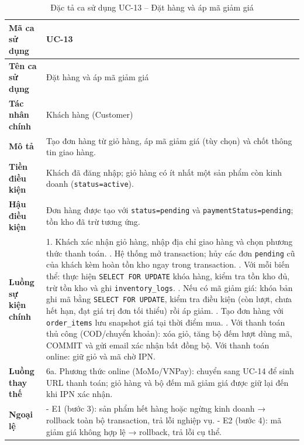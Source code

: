 \begin{longtable}{|p{3cm}|p{10.5cm}|}
  \caption{Đặc tả ca sử dụng UC-13 -- Đặt hàng và áp mã giảm giá}
  \label{tab:uc_spec_13} \\
  \hline
  \textbf{Mã ca sử dụng} & UC-13 \\ \hline
  \textbf{Tên ca sử dụng} & Đặt hàng và áp mã giảm giá \\ \hline
  \textbf{Tác nhân chính} & Khách hàng (Customer) \\ \hline
  \textbf{Mô tả} & Tạo đơn hàng từ giỏ hàng, áp mã giảm giá (tùy chọn) và chốt thông tin giao hàng. \\ \hline
  \textbf{Tiền điều kiện} & Khách đã đăng nhập; giỏ hàng có ít nhất một sản phẩm còn kinh doanh (\texttt{status=active}). \\ \hline
  \textbf{Hậu điều kiện} & Đơn hàng được tạo với \texttt{status=pending} và \texttt{paymentStatus=pending}; tồn kho đã trừ tương ứng. \\ \hline
  \textbf{Luồng sự kiện chính} &
  1. Khách xác nhận giỏ hàng, nhập địa chỉ giao hàng và chọn phương thức thanh toán. \newline
  2. Hệ thống mở transaction; hủy các đơn \texttt{pending} cũ của khách kèm hoàn tồn kho ngay trong transaction. \newline
  3. Với mỗi biến thể: thực hiện \texttt{SELECT FOR UPDATE} khóa hàng, kiểm tra tồn kho đủ, trừ tồn kho và ghi \texttt{inventory\_logs}. \newline
  4. Nếu có mã giảm giá: khóa bản ghi mã bằng \texttt{SELECT FOR UPDATE}, kiểm tra điều kiện (còn lượt, chưa hết hạn, đạt giá trị đơn tối thiểu) rồi áp giảm. \newline
  5. Tạo đơn hàng với \texttt{order\_items} lưu snapshot giá tại thời điểm mua. \newline
  6. Với thanh toán thủ công (COD\slash chuyển khoản): xóa giỏ, tăng bộ đếm lượt dùng mã, COMMIT và gửi email xác nhận bất đồng bộ. Với thanh toán online: giữ giỏ và mã chờ IPN. \\ \hline
  \textbf{Luồng thay thế} & 6a. Phương thức online (MoMo\slash VNPay): chuyển sang UC-14 để sinh URL thanh toán; giỏ hàng và bộ đếm mã giảm giá được giữ lại đến khi IPN xác nhận. \\ \hline
  \textbf{Ngoại lệ} &
  - E1 (bước 3): sản phẩm hết hàng hoặc ngừng kinh doanh → rollback toàn bộ transaction, trả lỗi nghiệp vụ. \newline
  - E2 (bước 4): mã giảm giá không hợp lệ → rollback, trả lỗi cụ thể. \\ \hline
\end{longtable}

